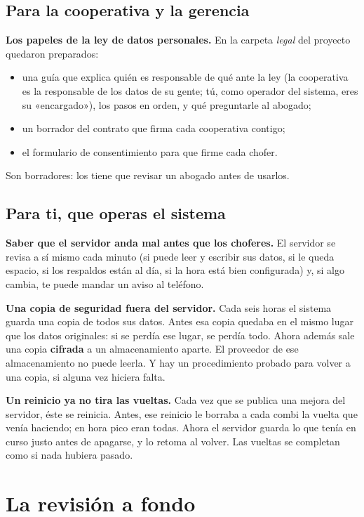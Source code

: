 \documentclass[12pt,a4paper]{article}
\begin{document}
\subsection{Para la cooperativa y la gerencia}

\textbf{Los papeles de la ley de datos personales.} En la carpeta
\emph{legal} del proyecto quedaron preparados:
\begin{itemize}[leftmargin=1.2em]
  \item una guía que explica quién es responsable de qué ante la ley (la
  cooperativa es la responsable de los datos de su gente; tú, como operador
  del sistema, eres su «encargado»), los pasos en orden, y qué preguntarle al
  abogado;
  \item un borrador del contrato que firma cada cooperativa contigo;
  \item el formulario de consentimiento para que firme cada chofer.
\end{itemize}
Son borradores: los tiene que revisar un abogado antes de usarlos.

\subsection{Para ti, que operas el sistema}

\textbf{Saber que el servidor anda mal antes que los choferes.} El servidor
se revisa a sí mismo cada minuto (si puede leer y escribir sus datos, si le
queda espacio, si los respaldos están al día, si la hora está bien
configurada) y, si algo cambia, te puede mandar un aviso al teléfono.

\textbf{Una copia de seguridad fuera del servidor.} Cada seis horas el sistema
guarda una copia de todos sus datos. Antes esa copia quedaba en el mismo
lugar que los datos originales: si se perdía ese lugar, se perdía todo. Ahora
además sale una copia \textbf{cifrada} a un almacenamiento aparte. El
proveedor de ese almacenamiento no puede leerla. Y hay un procedimiento
probado para volver a una copia, si alguna vez hiciera falta.

\textbf{Un reinicio ya no tira las vueltas.} Cada vez que se publica una
mejora del servidor, éste se reinicia. Antes, ese reinicio le borraba a cada
combi la vuelta que venía haciendo; en hora pico eran todas. Ahora el
servidor guarda lo que tenía en curso justo antes de apagarse, y lo retoma al
volver. Las vueltas se completan como si nada hubiera pasado.

\section{La revisión a fondo}
\end{document}

